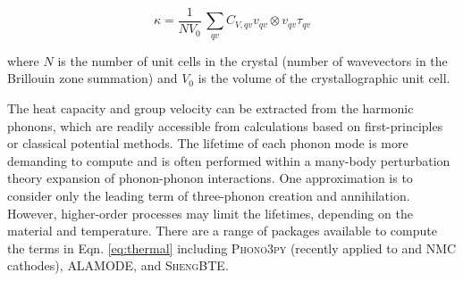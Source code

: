 \documentclass[../main.tex]{subfiles}
\begin{document}
\begin{equation}
    \kappa = \frac{1}{NV_0} \,\sum_{qv} C_{V,qv} v_{qv} \otimes v_{qv} \tau_{qv}
    \label{eq:thermal}
\end{equation}

where $N$ is the number of unit cells in the crystal (number of wavevectors in the Brillouin zone summation) and $V_0$ is the volume of the crystallographic unit cell.

The heat capacity and group velocity can be extracted from the harmonic phonons, which are readily accessible from calculations based on first-principles or classical potential methods. The lifetime of each phonon mode is more demanding to compute and is often performed within a many-body perturbation theory expansion of phonon-phonon interactions. One approximation is to consider only the leading term of three-phonon creation and annihilation. \cite{togo_distributions_2015} However, higher-order processes may limit the lifetimes, depending on the material and temperature. There are a range of packages available to compute the terms in Eqn. \ref{eq:thermal} including \textsc{Phono3py} \cite{phono3py} (recently applied to  and NMC cathodes)\cite{yang2019highly,yang2020chemical}, \textsc{ALAMODE}\cite{tadano2014anharmonic}, and \textsc{ShengBTE}\cite{ShengBTE_2014}.

 
\end{document}
